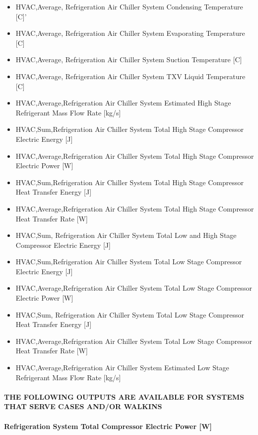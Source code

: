 \begin{itemize}
\item
  HVAC,Average, Refrigeration Air Chiller System Condensing Temperature {[}C{]}'
\item
  HVAC,Average, Refrigeration Air Chiller System Evaporating Temperature {[}C{]}
\item
  HVAC,Average, Refrigeration Air Chiller System Suction Temperature {[}C{]}
\item
  HVAC,Average, Refrigeration Air Chiller System TXV Liquid Temperature {[}C{]}
\item
  HVAC,Average,Refrigeration Air Chiller System Estimated High Stage Refrigerant Mass Flow Rate {[}kg/s{]}
\item
  HVAC,Sum,Refrigeration Air Chiller System Total High Stage Compressor Electric Energy {[}J{]}
\item
  HVAC,Average,Refrigeration Air Chiller System Total High Stage Compressor Electric Power {[}W{]}
\item
  HVAC,Sum,Refrigeration Air Chiller System Total High Stage Compressor Heat Transfer Energy {[}J{]}
\item
  HVAC,Average,Refrigeration Air Chiller System Total High Stage Compressor Heat Transfer Rate {[}W{]}
\item
  HVAC,Sum, Refrigeration Air Chiller System Total Low and High Stage Compressor Electric Energy {[}J{]}
\item
  HVAC,Sum,Refrigeration Air Chiller System Total Low Stage Compressor Electric Energy {[}J{]}
\item
  HVAC,Average,Refrigeration Air Chiller System Total Low Stage Compressor Electric Power {[}W{]}
\item
  HVAC,Sum, Refrigeration Air Chiller System Total Low Stage Compressor Heat Transfer Energy {[}J{]}
\item
  HVAC,Average,Refrigeration Air Chiller System Total Low Stage Compressor Heat Transfer Rate {[}W{]}
\item
  HVAC,Average,Refrigeration Air Chiller System Estimated Low Stage Refrigerant Mass Flow Rate {[}kg/s{]}
\end{itemize}

\paragraph{THE FOLLOWING OUTPUTS ARE AVAILABLE FOR SYSTEMS THAT SERVE CASES AND/OR WALKINS}\label{the-following-outputs-are-available-for-systems-that-serve-cases-andor-walkins}

\paragraph{Refrigeration System Total Compressor Electric Power {[}W{]}}\label{refrigeration-system-total-compressor-electric-power-w}

